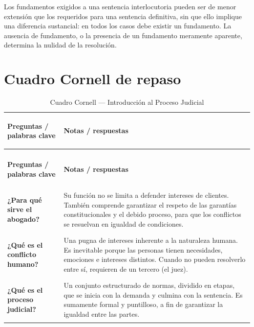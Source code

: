 \documentclass[12pt,oneside]{book}
\begin{document}
Los fundamentos exigidos a una sentencia interlocutoria pueden ser de menor extensión que los requeridos para una sentencia definitiva, sin que ello implique una diferencia sustancial: en todos los casos debe existir un fundamento. La ausencia de fundamento, o la presencia de un fundamento meramente aparente, determina la nulidad de la resolución.

\section*{Cuadro Cornell de repaso}

\begin{longtable}{
    >{\bfseries\raggedright\arraybackslash}p{}
    p{}
}
\caption{Cuadro Cornell --- Introducción al Proceso Judicial} \\
\toprule
\textbf{Preguntas / palabras clave} & \textbf{Notas / respuestas} \\
\midrule
\endfirsthead

\multicolumn{2}{c}{\textit{(continuación)}} \\
\toprule
\textbf{Preguntas / palabras clave} & \textbf{Notas / respuestas} \\
\midrule
\endhead

\bottomrule
\endfoot

\bottomrule
\endlastfoot

\textbf{¿Para qué sirve el abogado?} &
Su función no se limita a defender intereses de clientes. También comprende garantizar el respeto de las garantías constitucionales y el debido proceso, para que los conflictos se resuelvan en igualdad de condiciones. \\

\textbf{¿Qué es el conflicto humano?} &
Una pugna de intereses inherente a la naturaleza humana. Es inevitable porque las personas tienen necesidades, emociones e intereses distintos. Cuando no pueden resolverlo entre sí, requieren de un tercero (el juez). \\

\textbf{¿Qué es el proceso judicial?} &
Un conjunto estructurado de normas, dividido en etapas, que se inicia con la demanda y culmina con la sentencia. Es sumamente formal y puntilloso, a fin de garantizar la igualdad entre las partes. \\


\end{longtable}
\end{document}
